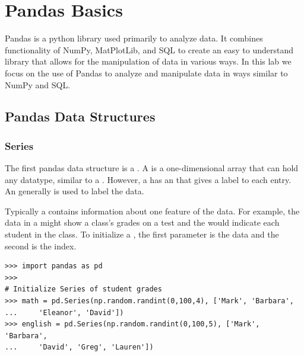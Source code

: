 \label{lab:pandas1}

\section*{Pandas Basics}

Pandas is a python library used primarily to analyze data.
It combines functionality of NumPy, MatPlotLib, and SQL to create an easy to understand library that allows for the manipulation of data in various ways.
In this lab we focus on the use of Pandas to analyze and manipulate data in ways similar to NumPy and SQL.

\subsection*{Pandas Data Structures}

\subsubsection*{Series}

The first pandas data structure is a .
A  is a one-dimensional array that can hold any datatype, similar to a .
However, a  has an  that gives a label to each entry.
An  generally is used to label the data.

Typically a  contains information about one feature of the data.
For example, the data in a  might show a class's grades on a test and the  would indicate each student in the class.
To initialize a , the first parameter is the data and the second is the index.

\begin{lstlisting}
>>> import pandas as pd
>>>
# Initialize Series of student grades
>>> math = pd.Series(np.random.randint(0,100,4), ['Mark', 'Barbara',
...		'Eleanor', 'David'])
>>> english = pd.Series(np.random.randint(0,100,5), ['Mark', 'Barbara',
...		'David', 'Greg', 'Lauren'])
\end{lstlisting}

